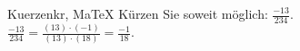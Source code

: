 \begin{MAufgabe}{Kuerzen}{kr, MaTeX}
K\"urzen Sie soweit m\"oglich: $\frac{-13}{234}$.\\ 
\ifLsg\MLoesung
\quad $\frac{-13}{234}=\frac{(13)\cdot(-1)}{(13)\cdot(18)}=\frac{-1}{18}$.\else\relax\fi
 \end{MAufgabe}